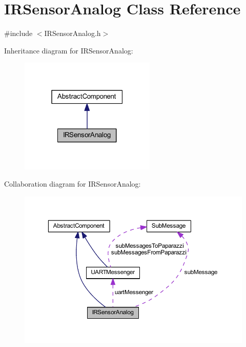 \hypertarget{class_i_r_sensor_analog}{}\section{I\+R\+Sensor\+Analog Class Reference}
\label{class_i_r_sensor_analog}


{\ttfamily \#include $<$I\+R\+Sensor\+Analog.\+h$>$}



Inheritance diagram for I\+R\+Sensor\+Analog\+:\nopagebreak
\begin{figure}[H]
\begin{center}
\leavevmode
\includegraphics[width=183pt]{class_i_r_sensor_analog__inherit__graph}
\end{center}
\end{figure}


Collaboration diagram for I\+R\+Sensor\+Analog\+:\nopagebreak
\begin{figure}[H]
\begin{center}
\leavevmode
\includegraphics[width=350pt]{class_i_r_sensor_analog__coll__graph}
\end{center}
\end{figure}
